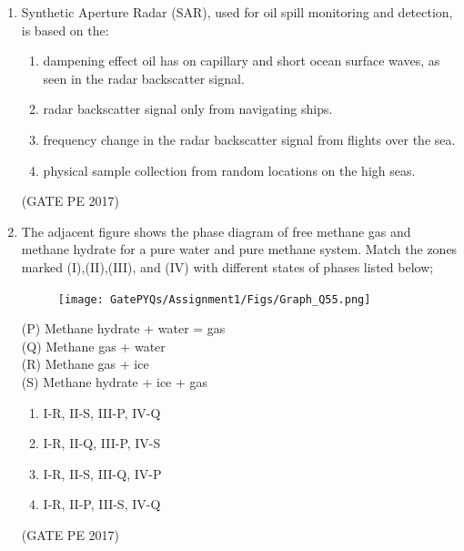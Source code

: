 \documentclass[journal,12pt,onecolumn]{IEEEtran}
\theoremstyle{remark}
\begin{document}
\begin{enumerate}[start=1, label={Q\arabic*.}]
Options:
\begin{enumerate}
\item P-I, Q-III, R-IV  
\item P-IV, Q-I, R-III  
\item P-IV, Q-I, R-II  
\item P-IV, Q-II, R-III  
\end{enumerate}
\hfill{(GATE PE 2017)}

\item Synthetic Aperture Radar (SAR), used for oil spill monitoring and detection, is based on the:\\
\begin{enumerate}
\item dampening effect oil has on capillary and short ocean surface waves, as seen in the radar backscatter signal.
\item radar backscatter signal only from navigating ships.
\item frequency change in the radar backscatter signal from flights over the sea.
\item physical sample collection from random locations on the high seas.
\end{enumerate}
\hfill{(GATE PE 2017)}

\item The adjacent figure shows the phase diagram of free methane gas and methane hydrate for a pure water and pure methane system. Match the zones marked (I),(II),(III), and (IV) with different states of phases listed below;

\begin{figure}[h]
    \centering
    \texttt{[image: GatePYQs/Assignment1/Figs/Graph\_Q55.png]}
\end{figure}
(P) Methane hydrate + water = gas\\
(Q) Methane gas + water\\
(R) Methane gas + ice\\
(S) Methane hydrate + ice + gas\\

\begin{enumerate}
    \item I-R, II-S, III-P, IV-Q
    \item I-R, II-Q, III-P, IV-S
    \item I-R, II-S, III-Q, IV-P
    \item I-R, II-P, III-S, IV-Q
\end{enumerate}
\hfill{(GATE PE 2017)}




\end{enumerate}
\end{document}
